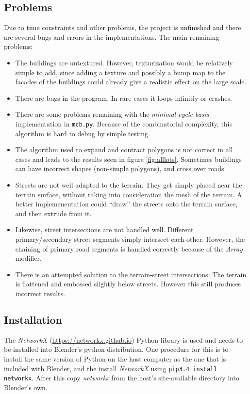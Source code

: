 \documentclass[a4paper,12pt]{scrartcl}
\begin{document}
\subsection{Problems}
Due to time constraints and other problems, the project is unfinished and there are several bugs and errors in the implementations. The main remaining problems:
\begin{itemize}
\item The buildings are untextured. However, texturization would be relatively simple to add, since adding a texture and possibly a bump map to the facades of the buildings could already give a realistic effect on the large scale.
\item There are bugs in the program. In rare cases it loops infinitly or crashes.
\item There are some problems remaining with the \emph{minimal cycle basis} implementation in \texttt{mcb.py}. Because of the combinatorial complexity, this algorithm is hard to debug by simple testing.
\item The algorithm used to expand and contract polygons is not correct in all cases and leads to the results seen in figure \ref{fig:alllots}. Sometimes buildings can have incorrect shapes (non-simple polygons), and cross over roads.
\item Streets are not well adapted to the terrain. They get simply placed near the terrain surface, without taking into consideration the mesh of the terrain. A better implemenentation could ``draw'' the streets onto the terrain surface, and then extrude from it.
\item Likewise, street intersections are not handled well. Different primary/secondary street segments simply intersect each other. However, the chaining of primary road segments is handled correctly because of the \emph{Array} modifier.
\item There is an attempted solution to the terrain-street intersections: The terrain is flattened and embossed slightly below streets. However this still produces incorrect results.
\end{itemize}

\subsection{Installation}
The \emph{NetworkX} (\url{https://networkx.github.io}) Python library is used and needs to be installed into Blender's python distribution. One procedure for this is to install the same version of Python on the host computer as the one that is included with Blender, and the install \emph{NetworkX} using \texttt{pip3.4 install networkx}. After this copy \emph{networkx} from the host's {site-available} directory into Blender's own.
\end{document}
